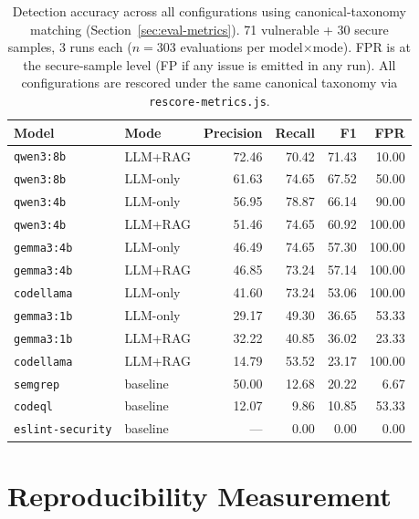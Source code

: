 \begin{table}[H]
\centering
\caption[Detection accuracy across all configurations under canonical-taxonomy matching.]{Detection accuracy across all configurations using canonical-taxonomy matching (Section~\ref{sec:eval-metrics}). 71 vulnerable + 30 secure samples, 3 runs each ($n = 303$ evaluations per model$\times$mode). FPR is at the secure-sample level (FP if any issue is emitted in any run). All configurations are rescored under the same canonical taxonomy via \texttt{rescore-metrics.js}.}
\label{tab:eval-r1-all-app}
\footnotesize
\begin{tabular}{@{}llrrrr@{}}
\toprule
\textbf{Model} & \textbf{Mode} & \textbf{Precision} & \textbf{Recall} & \textbf{F1} & \textbf{FPR} \\
\midrule
\texttt{qwen3:8b}        & LLM+RAG  & 72.46 & 70.42 & 71.43 & 10.00 \\
\texttt{qwen3:8b}        & LLM-only & 61.63 & 74.65 & 67.52 & 50.00 \\
\texttt{qwen3:4b}        & LLM-only & 56.95 & 78.87 & 66.14 & 90.00 \\
\texttt{qwen3:4b}        & LLM+RAG  & 51.46 & 74.65 & 60.92 & 100.00 \\
\texttt{gemma3:4b}       & LLM-only & 46.49 & 74.65 & 57.30 & 100.00 \\
\texttt{gemma3:4b}       & LLM+RAG  & 46.85 & 73.24 & 57.14 & 100.00 \\
\texttt{codellama}       & LLM-only & 41.60 & 73.24 & 53.06 & 100.00 \\
\texttt{gemma3:1b}       & LLM-only & 29.17 & 49.30 & 36.65 & 53.33 \\
\texttt{gemma3:1b}       & LLM+RAG  & 32.22 & 40.85 & 36.02 & 23.33 \\
\texttt{codellama}       & LLM+RAG  & 14.79 & 53.52 & 23.17 & 100.00 \\
\midrule
\texttt{semgrep}         & baseline & 50.00 & 12.68 & 20.22 & 6.67 \\
\texttt{codeql}          & baseline & 12.07 & 9.86  & 10.85 & 53.33 \\
\texttt{eslint-security} & baseline & ---   & 0.00  & 0.00  & 0.00 \\
\bottomrule
\end{tabular}
\end{table}

\section{Reproducibility Measurement}
\label{sec:eval-reproducibility-metric}

